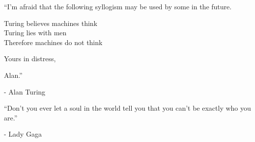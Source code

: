 \clearpage

\thispagestyle{empty}

\vspace*{\fill}
\begin{center}
    ``I'm afraid that the following syllogism may be used by some in the future.
    
    Turing believes machines think\\
    Turing lies with men\\
    Therefore machines do not think
    
    Yours in distress,
    
    Alan.''
\end{center}

\begin{flushright}
    - Alan Turing
\end{flushright}


\vspace*{3cm}

\begin{center}
    ``Don't you ever let a soul in the world tell you that you can't be exactly who you are.''
\end{center}


\begin{flushright}
    - Lady Gaga
\end{flushright}


\vfill

\clearpage